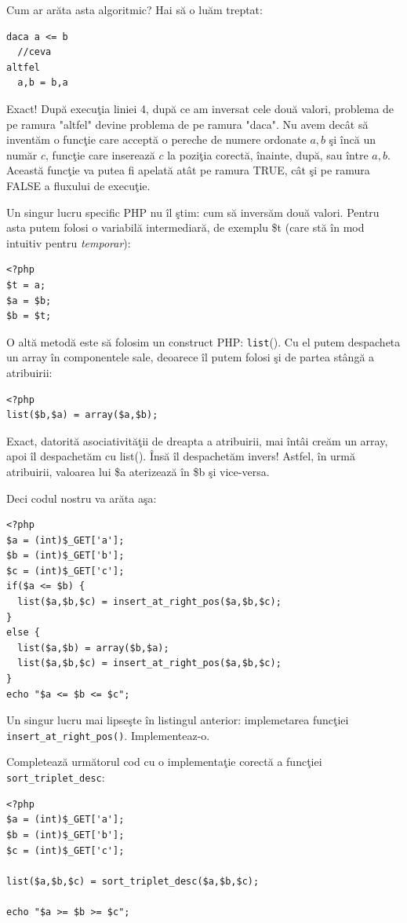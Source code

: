 Cum ar arăta asta algoritmic? Hai să o luăm treptat:
\begin{lstlisting}[language=pseudocod]
daca a <= b
  //ceva
altfel
  a,b = b,a
\end{lstlisting}
Exact! După execuţia liniei 4, după ce am inversat cele două valori, problema de pe ramura
"altfel" devine problema de pe ramura "daca". Nu avem decât să inventăm o funcţie
care acceptă o pereche de numere ordonate $a,b$ şi încă un număr $c$, funcţie care inserează
$c$ la poziţia corectă, înainte, după, sau între $a,b$. Această funcţie va putea
fi apelată atât pe ramura TRUE, cât şi pe ramura FALSE a fluxului de execuţie.

Un singur lucru specific PHP nu îl ştim: cum să inversăm două valori. Pentru
asta putem folosi o variabilă intermediară, de exemplu \$t (care stă în mod intuitiv
pentru \textit{temporar}):
\begin{lstlisting}
<?php
$t = a;
$a = $b;
$b = $t;
\end{lstlisting}

O altă metodă este să folosim un construct PHP: \texttt{list}().
Cu el putem despacheta un array în componentele sale, deoarece îl
putem folosi şi de partea stângă a atribuirii:
\begin{lstlisting}
<?php
list($b,$a) = array($a,$b);
\end{lstlisting}
Exact, datorită asociativităţii de dreapta a atribuirii, mai întâi
creăm un array, apoi îl despachetăm cu list(). Însă îl despachetăm invers!
Astfel, în urmă atribuirii, valoarea lui \$a aterizează în \$b şi vice-versa.

Deci codul nostru va arăta aşa:
\begin{lstlisting}
<?php
$a = (int)$_GET['a'];
$b = (int)$_GET['b'];
$c = (int)$_GET['c'];
if($a <= $b) {
  list($a,$b,$c) = insert_at_right_pos($a,$b,$c);
}
else {
  list($a,$b) = array($b,$a);
  list($a,$b,$c) = insert_at_right_pos($a,$b,$c);
}
echo "$a <= $b <= $c";
\end{lstlisting}

\begin{Exercise}[title={Insert at the right position},difficulty=3]
\ExePart
Un singur lucru mai lipseşte în listingul anterior: implemetarea funcţiei
\texttt{insert\_at\_right\_pos()}. Implementeaz-o.

\ExePart
Completează următorul cod cu o implementaţie corectă a funcţiei
\texttt{sort\_triplet\_desc}:
\begin{lstlisting}
<?php
$a = (int)$_GET['a'];
$b = (int)$_GET['b'];
$c = (int)$_GET['c'];

list($a,$b,$c) = sort_triplet_desc($a,$b,$c);

echo "$a >= $b >= $c";
\end{lstlisting}
\end{Exercise}


